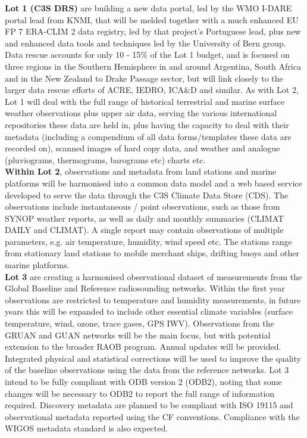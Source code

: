 \documentclass[a4paper]{article}
\begin{document}
\textbf{Lot 1 (C3S DRS)} are building a new data portal, led by the WMO I-DARE portal lead from KNMI, that will be melded together with a much enhanced EU FP 7 ERA-CLIM 2 data registry, led by that project's Portuguese lead, plus new and enhanced data tools and techniques led by the University of Bern group. Data rescue accounts for only 10 - 15\% of the Lot 1 budget, and is focused on three regions in the Southern Hemisphere in and around Argentina, South Africa and in the New Zealand to Drake Passage sector, but will link closely to the larger data rescue efforts of ACRE, IEDRO, ICA\&D and similar. As with Lot 2, Lot 1 will deal with the full range of historical terrestrial and marine surface weather observations plus upper air data, serving the various international repositories these data are held in, plus having the capacity to deal with their metadata (including a compendium of all data forms/templates these data are recorded on), scanned images of hard copy data, and weather and analogue (pluviograms, thermograms, barograms etc) charts etc.\\

\textbf{Within Lot 2}, observations and metadata from land stations and marine platforms will be harmonised into a common data model and a web based service developed to serve the data through the C3S Climate Data Store (CDS). The observations include instantaneous / point observations, such as those from SYNOP weather reports, as well as daily and monthly summaries (CLIMAT DAILY and CLIMAT). A single report may contain observations of multiple parameters, e.g. air temperature, humidity, wind speed etc. The stations range from stationary land stations to mobile merchant ships, drifting buoys and other marine platforms.\\

\textbf{Lot 3} are creating a harmonised observational dataset of measurements from the Global Baseline and Reference radiosounding networks. Within the first year observations are restricted to temperature and humidity measurements, in future years this will be expanded to include other essential climate variables (surface temperature, wind, ozone, trace gases, GPS IWV). Observations from the GRUAN and GUAN networks will be the main focus, but with potential extension to the broader RAOB program. Annual updates will be provided. Integrated physical and statistical corrections will be used to improve the quality of the baseline observations using the data from the reference networks. Lot 3 intend to be fully compliant with ODB version 2 (ODB2), noting that some changes will be necessary to ODB2 to report the full range of information required. Discovery metadata are planned to be compliant with ISO 19115 and observational metadata reported using the CF conventions. Compliance with the WIGOS metadata standard is also expected. \\
\end{document}
